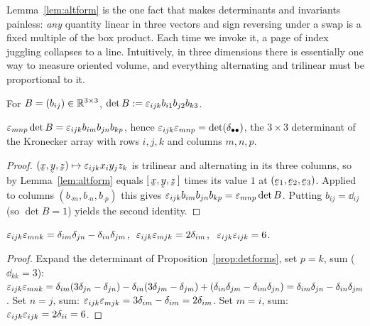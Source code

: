\begin{remark}\label{rem:workhorse}
Lemma~\ref{lem:altform} is the one fact that makes determinants and
invariants painless: \emph{any} quantity linear in three vectors and sign
reversing under a swap is a fixed multiple of the box product. Each time we
invoke it, a page of index juggling collapses to a line. Intuitively, in
three dimensions there is essentially one way to measure oriented volume,
and everything alternating and trilinear must be proportional to it.
\end{remark}

\begin{definition}[Determinant]\label{def:det}
For $B=(b_{ij})\in\mathbb{R}^{3\times3}$, $\det B:=\varepsilon_{ijk}b_{i1}b_{j2}b_{k3}$.
\end{definition}

\begin{proposition}\label{prop:detforms}
$\varepsilon_{mnp}\det B=\varepsilon_{ijk}b_{im}b_{jn}b_{kp}$, hence
$\varepsilon_{ijk}\varepsilon_{mnp}=\det(\delta_{\bullet\bullet})$, the $3\times3$
determinant of the Kronecker array with rows $i,j,k$ and
columns $m,n,p$.
\end{proposition}

\begin{proof}
$(\bx,\by,\bz)\mapsto\eps_{ijk}x_{i}y_{j}z_{k}$ is trilinear and
alternating in its three columns, so by Lemma~\ref{lem:altform} equals
$\tbox\bx\by\bz$ times its value $1$ at $(\be_1,\be_2,\be_3)$. Applied to
columns $(b_{\cdot m},b_{\cdot n},b_{\cdot p})$ this gives
$\varepsilon_{ijk}b_{im}b_{jn}b_{kp}=\varepsilon_{mnp}\det B$. Putting $b_{ij}=\dd_{ij}$
(so $\det B=1$) yields the second identity.
\end{proof}

\begin{theorem}\label{thm:epsdelta}
$\varepsilon_{ijk}\varepsilon_{mnk}=\delta_{im}\delta_{jn}-\delta_{in}\delta_{jm}$,
$\ \varepsilon_{ijk}\varepsilon_{mjk}=2\delta_{im}$, $\ \varepsilon_{ijk}\varepsilon_{ijk}=6$.
\end{theorem}

\begin{proof}
Expand the determinant of Proposition~\ref{prop:detforms}, set $p=k$, sum
($\dd_{kk}=3$):
$\varepsilon_{ijk}\varepsilon_{mnk}=\delta_{im}(3\delta_{jn}-\delta_{jn})-\delta_{in}(3\delta_{jm}
-\delta_{jm})+(\delta_{in}\delta_{jm}-\delta_{im}\delta_{jn})
=\delta_{im}\delta_{jn}-\delta_{in}\delta_{jm}$. Set $n=j$, sum:
$\varepsilon_{ijk}\varepsilon_{mjk}=3\delta_{im}-\delta_{im}=2\delta_{im}$. Set $m=i$, sum:
$\varepsilon_{ijk}\varepsilon_{ijk}=2\delta_{ii}=6$.
\end{proof}

